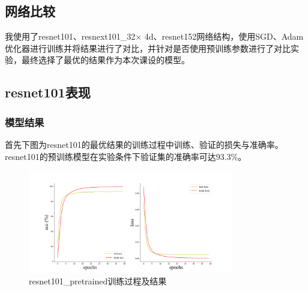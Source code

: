 \documentclass[10.5pt,a4paper]{article}%
\begin{document}
        \subsection{网络比较}
        我使用了resnet101、resnext101\_32$\times$ 4d、resnet152网络结构，使用SGD、Adam优化器进行训练并将结果进行了对比，并针对是否使用预训练参数进行了对比实验，最终选择了最优的结果作为本次课设的模型。
        \subsection{resnet101表现}
        \subsubsection{模型结果}
            首先下图为resnet101的最优结果的训练过程中训练、验证的损失与准确率。resnet101的预训练模型在实验条件下验证集的准确率可达93.3\%。\par
            \begin{figure}[H]
            \centering
                \includegraphics[width=0.8\textwidth]{resnet101_pretrained.png}
              \caption{resnet101\_pretrained训练过程及结果}
              \label{fig:resnet101_best_result}
            \end{figure}
\end{document}
